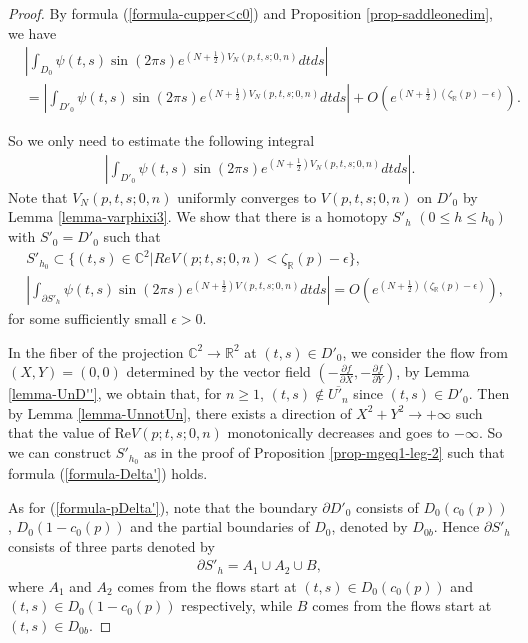 \documentclass[12pt]{amsart}
\begin{document}
\begin{proof}
By formula (\ref{formula-cupper<c0}) and  Proposition \ref{prop-saddleonedim}, we have
\begin{align}
&|\int_{D_0}\psi(t,s)\sin(2\pi s)e^{(N+\frac{1}{2})V_N(p,t,s;0,n)}dtds|\\\nonumber
&=|\int_{D'_0}\psi(t,s)\sin(2\pi s)e^{(N+\frac{1}{2})V_N(p,t,s;0,n)}dtds|+O(e^{(N+\frac{1}{2})(\zeta_{\mathbb{R}}(p)-\epsilon)}).     
\end{align}

So we only need to estimate the following integral 
\begin{align}
 |\int_{D'_0}\psi(t,s)\sin(2\pi s)e^{(N+\frac{1}{2})V_N(p,t,s;0,n)}dtds|.
\end{align}
Note that $V_N(p,t,s;0,n)$ uniformly converges to $V(p,t,s;0,n)$ on $D'_{0}$ by Lemma \ref{lemma-varphixi3}.
We show that there is a homotopy $S'_{h}$ $(0\leq h\leq h_0)$ with $S'_0=D'_0$  such that 
\begin{align}
    &S'_{h_0}\subset \{(t,s)\in \mathbb{C}^2|Re V(p;t,s;0,n)<\zeta_\mathbb{R}(p)-\epsilon\}, \label{formula-Delta'} \\
    &|\int_{\partial S'_{h}}\psi(t,s)\sin(2\pi s)e^{(N+\frac{1}{2})V(p,t,s;0,n)}dtds|=O(e^{(N+\frac{1}{2})(\zeta_\mathbb{R}(p)-\epsilon)}), \label{formula-pDelta'}
\end{align}
for some sufficiently small $\epsilon>0$.

In the fiber of the projection $\mathbb{C}^2\rightarrow \mathbb{R}^2$ at $(t,s)\in D'_0$, we consider the flow from $(X,Y)=(0,0)$ determined by the vector field $\left(-\frac{\partial f}{\partial X},-\frac{\partial f}{\partial Y}\right)$, by Lemma \ref{lemma-UnD''}, we obtain that, for $n\geq 1$, $(t,s)\notin \overline{U'_n} $ since $(t,s)\in D'_0$. Then by Lemma \ref{lemma-UnnotUn}, there exists a direction of $X^2+Y^2\rightarrow +\infty$ such that the value of $\text{Re} V(p;t,s;0,n)$ monotonically decreases and goes to $-\infty$.  So we can construct $S'_{h_0}$ as in the proof of Proposition \ref{prop-mgeq1-leg-2} such that formula (\ref{formula-Delta'}) holds.  




As for (\ref{formula-pDelta'}), note that the boundary $\partial D'_0$ consists of $D_0(c_{0}(p))$, $D_0(1-c_{0}(p))$ and the partial boundaries of $D_0$, denoted by $D_{0b}$.  Hence $\partial S'_{h}$ consists of three parts denoted by 
\begin{align}
    \partial S'_{h}=A_1\cup A_2\cup B,
\end{align}
where $A_1$ and $A_2$ comes from the flows start at $(t,s)\in D_0(c_{0}(p))$ and  $(t,s)\in D_0(1-c_{0}(p))$ respectively, while $B$ comes from the flows start at $(t,s)\in D_{0b}$.


\end{proof}
\end{document}
